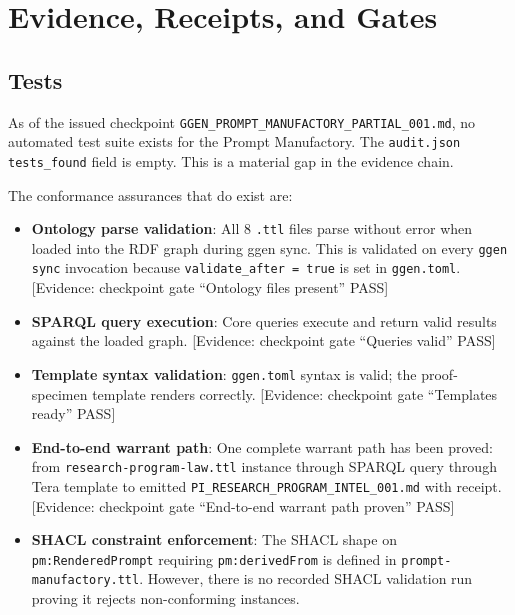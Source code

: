 
\section{Evidence, Receipts, and Gates}
\label{sec:research-prompt-manufactory-evidence}

\subsection{Tests}
\label{sec:research-prompt-manufactory-evidence-tests}

As of the issued checkpoint \texttt{GGEN\_PROMPT\_MANUFACTORY\_PARTIAL\_001.md}, no
automated test suite exists for the Prompt Manufactory. The \texttt{audit.json}
\texttt{tests\_found} field is empty. This is a material gap in the evidence chain.

The conformance assurances that do exist are:
\begin{itemize}
  \item \textbf{Ontology parse validation}: All 8 \texttt{.ttl} files parse without
    error when loaded into the RDF graph during ggen sync. This is validated on every
    \texttt{ggen sync} invocation because \texttt{validate\_after = true} is set in
    \texttt{ggen.toml}. [Evidence: checkpoint gate ``Ontology files present'' PASS]
  \item \textbf{SPARQL query execution}: Core queries execute and return valid results
    against the loaded graph. [Evidence: checkpoint gate ``Queries valid'' PASS]
  \item \textbf{Template syntax validation}: \texttt{ggen.toml} syntax is valid; the
    proof-specimen template renders correctly. [Evidence: checkpoint gate ``Templates
    ready'' PASS]
  \item \textbf{End-to-end warrant path}: One complete warrant path has been proved:
    from \texttt{research-program-law.ttl} instance through SPARQL query through Tera
    template to emitted \texttt{PI\_RESEARCH\_PROGRAM\_INTEL\_001.md} with receipt.
    [Evidence: checkpoint gate ``End-to-end warrant path proven'' PASS]
  \item \textbf{SHACL constraint enforcement}: The SHACL shape on
    \texttt{pm:RenderedPrompt} requiring \texttt{pm:derivedFrom} is defined in
    \texttt{prompt-manufactory.ttl}. However, there is no recorded SHACL validation
    run proving it rejects non-conforming instances.
\end{itemize}

